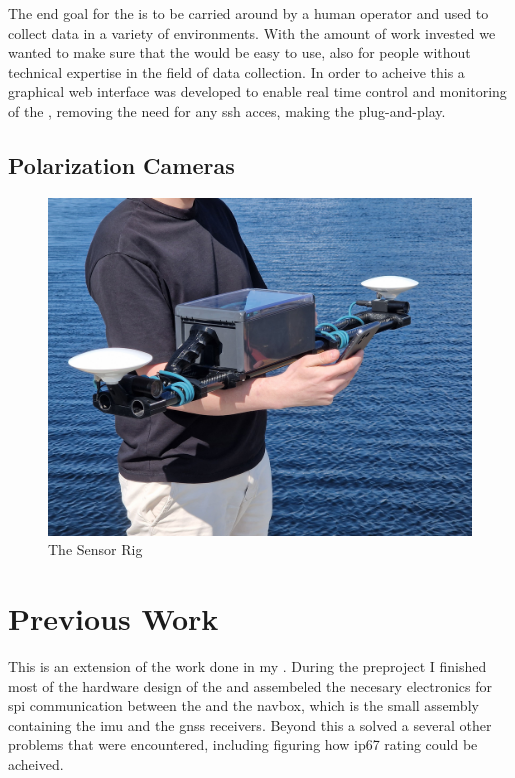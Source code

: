 The end goal for the \sr is to be carried around by a human operator and used to collect data in a variety of environments.
With the amount of work invested we wanted to make sure that the \sr would be easy to use, also for people without technical expertise in the field of data collection.
In order to acheive this a graphical web interface was developed to enable real time control and monitoring of the \sr, removing the need for any ssh acces, making the \sr plug-and-play.

\subsection{Polarization Cameras}

\begin{figure}[H]
    \includegraphics[width=\textwidth]{figures/frontpage.jpg}
    \caption{The Sensor Rig}
\end{figure}

\section{Previous Work}
This \master is an extension of the work done in my \preproject \cite{martensPortableSensorRig2022}.
During the preproject I finished most of the hardware design of the \sr
and assembeled the necesary electronics for \gls{spi} communication between the \jx and the \gls{navbox}, which is the small assembly containing the \gls{imu} and the \gls{gnss} receivers.
Beyond this a solved a several other problems that were encountered, including figuring how \gls{ip67} rating could be acheived.

